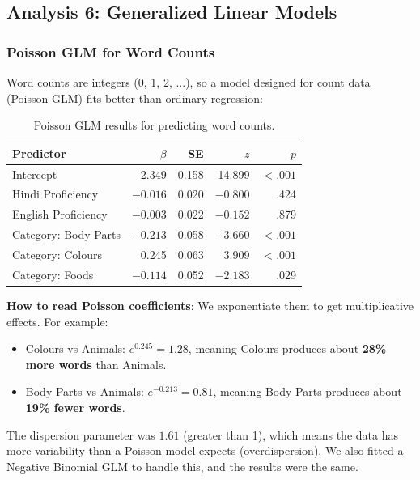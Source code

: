 \documentclass[12pt, a4paper]{article}
\begin{document}
\subsection{Analysis 6: Generalized Linear Models}

\subsubsection{Poisson GLM for Word Counts}

Word counts are integers (0, 1, 2, ...), so a model designed for count data (Poisson GLM) fits better than ordinary regression:

\begin{table}[H]
\centering
\caption{Poisson GLM results for predicting word counts.}
\label{tab:poisson}
\begin{tabular}{lrrrr}
\toprule
\textbf{Predictor} & \textbf{$\beta$} & \textbf{SE} & \textbf{$z$} & \textbf{$p$} \\
\midrule
Intercept & 2.349 & 0.158 & 14.899 & $<.001$ \\
Hindi Proficiency & $-0.016$ & 0.020 & $-0.800$ & .424 \\
English Proficiency & $-0.003$ & 0.022 & $-0.152$ & .879 \\
Category: Body Parts & $-0.213$ & 0.058 & $-3.660$ & $<.001$ \\
Category: Colours & 0.245 & 0.063 & 3.909 & $<.001$ \\
Category: Foods & $-0.114$ & 0.052 & $-2.183$ & .029 \\
\bottomrule
\end{tabular}
\end{table}

\textbf{How to read Poisson coefficients}: We exponentiate them to get multiplicative effects. For example:
\begin{itemize}[nosep]
    \item Colours vs Animals: $e^{0.245} = 1.28$, meaning Colours produces about \textbf{28\% more words} than Animals.
    \item Body Parts vs Animals: $e^{-0.213} = 0.81$, meaning Body Parts produces about \textbf{19\% fewer words}.
\end{itemize}

The dispersion parameter was $1.61$ (greater than 1), which means the data has more variability than a Poisson model expects (overdispersion). We also fitted a Negative Binomial GLM to handle this, and the results were the same.
\end{document}
